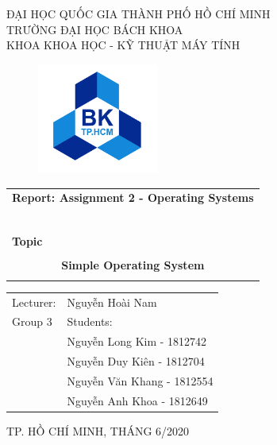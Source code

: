 \begin{titlepage} %
\begin{center}
ĐẠI HỌC QUỐC GIA THÀNH PHỐ HỒ CHÍ MINH \\
TRƯỜNG ĐẠI HỌC BÁCH KHOA \\
KHOA KHOA HỌC - KỸ THUẬT MÁY TÍNH 
\end{center}
\vspace{1cm}
\begin{figure}[h!]
\begin{center}
\includegraphics[width=4cm]{images/LogoBK.png}
\end{center}
\end{figure}
\vspace{1cm}
\begin{center}
\begin{tabular}{c}
\multicolumn{1}{c}{\textbf{{\Large Report: Assignment 2 - Operating Systems }}}\\
~~\\

\hline
\\
\multicolumn{1}{l}{\textbf{{\Large Topic}}}\\
\\
\textbf{{\Huge Simple Operating System}}\\
\\
\hline
\end{tabular}
\end{center}
\vspace{0.5cm}
\vspace{0.5cm}
\begin{table}[h]
\hspace{5cm} 
\begin{tabular}{ll}
    Lecturer: & Nguyễn Hoài Nam\\
    Group 3 & Students:\\
   		& Nguyễn Long Kim - 1812742 \\
		& Nguyễn Duy Kiên - 1812704 \\
		& Nguyễn Văn Khang - 1812554 \\
		& Nguyễn Anh Khoa - 1812649 \\
\end{tabular}
\end{table}
\vspace{5cm}
\begin{center}
{\footnotesize TP. HỒ CHÍ MINH, THÁNG 6/2020}
\end{center}
\end{titlepage} %